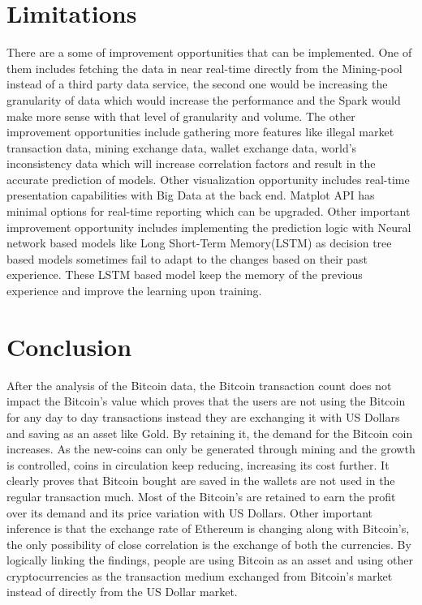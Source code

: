 \documentclass[sigconf]{acmart}
\begin{document}
\section{Limitations}
There are a some of improvement opportunities that can be implemented. One of them includes fetching the data in near real-time directly from the Mining-pool instead of a third party data service, the second one would be increasing the granularity of data which would increase the performance and the Spark would make more sense with that level of granularity and volume. The other improvement opportunities include gathering more features like illegal market transaction data, mining exchange data, wallet exchange data, world's inconsistency data which will increase correlation factors and result in the accurate prediction of models. Other visualization opportunity includes real-time presentation capabilities with Big Data at the back end. Matplot API has minimal options for real-time reporting which can be upgraded.
Other important improvement opportunity includes implementing the prediction logic with Neural network based models like Long Short-Term Memory(LSTM) as decision tree based models sometimes fail to adapt to the changes based on their past experience. These LSTM based model keep the memory of the previous experience and improve the learning upon training.

\section{Conclusion}
After the analysis of the Bitcoin data, the Bitcoin transaction count does not impact the Bitcoin's value which proves that the users are not using the Bitcoin for any day to day transactions instead they are exchanging it with US Dollars and saving as an asset like Gold. By retaining it, the demand for the Bitcoin coin increases. As the new-coins can only be generated through mining and the growth is controlled, coins in circulation keep reducing, increasing its cost further. It clearly proves that Bitcoin bought are saved in the wallets are not used in the regular transaction much. Most of the Bitcoin's are retained to earn the profit over its demand and its price variation with US Dollars. Other important inference is that the exchange rate of Ethereum is changing along with Bitcoin's, the only possibility of close correlation is the exchange of both the currencies. By logically linking the findings, people are using Bitcoin as an asset and using other cryptocurrencies as the transaction medium exchanged from Bitcoin's market instead of directly from the US Dollar market.
\end{document}
